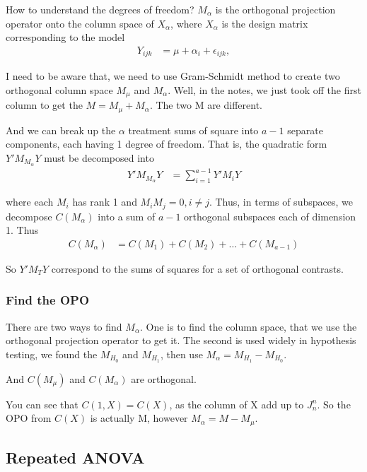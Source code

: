 How to understand the degrees of freedom? $M_{\alpha}$ is the orthogonal projection operator onto the column space of $X_{\alpha}$, where $X_{\alpha}$ is the design matrix corresponding to the model
 \begin{align*}
    Y_{ijk} &= \mu + \alpha_i +  \epsilon_{ijk},  
\end{align*}

I need to be aware that, we need to use Gram-Schmidt method to create two orthogonal column space $M_{\mu}$ and $M_{\alpha}$. Well, in the notes, we just took off the first column to get the $M = M_{\mu} + M_{\alpha}$. The two M are different.

And we can break up the $\alpha$ treatment sums of square into $a-1$ separate components, each having 1 degree of freedom. That is, the quadratic form $Y'M_{M_{\alpha}} Y$ must be decomposed into
 \begin{align*}
    Y'M_{M_{\alpha}} Y &= \sum_{i=1}^{a-1} Y'M_i Y  
\end{align*}

where each $M_i$ has rank 1 and $M_iM_j = 0, i \neq j$. Thus, in terms of subspaces, we decompose $C(M_{\alpha})$ into a sum of $a-1$ orthogonal subspaces each of dimension 1. Thus
 \begin{align*}
    C(M_{\alpha}) &= C(M_{1}) + C(M_2) +… + C(M_{a-1}) 
\end{align*}

So $Y'M_TY$ correspond to the sums of squares for a set of orthogonal contrasts. 


\subsubsection{Find the OPO}

There are two ways to find $M_{\alpha}$. One is to find the column space, that we use the orthogonal projection operator to get it. The second is used widely in hypothesis testing, we found the $M_{H_0}$ and $M_{H_1}$, then use $M_{\alpha} = M_{H_1} - M_{H_0}$. 

And $C(M_{\mu})$ and $C(M_{\alpha})$ are orthogonal. 

You can see that $C(1, X) = C(X)$, as the column of X add up to $J_n^n$. So the OPO from $C(X)$ is actually M, however $M_{\alpha} = M - M_{\mu}$.


\subsection{Repeated ANOVA}

